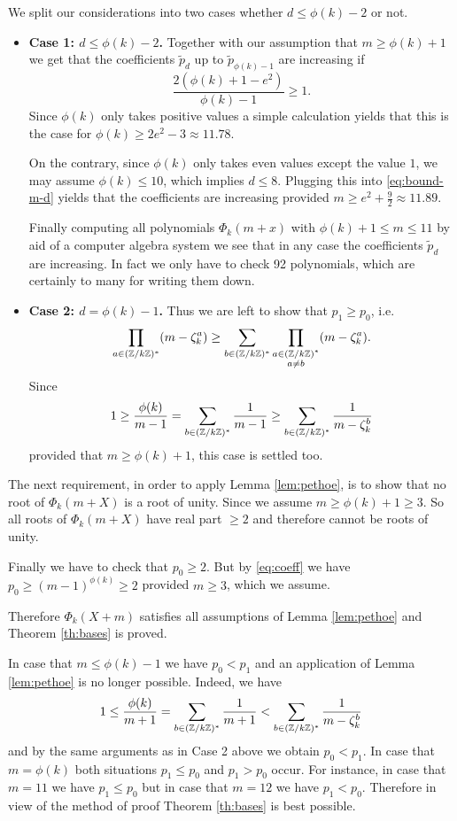 We split our considerations into two cases whether $d\leq\phi(k)-2$ or not.
\begin{itemize}
\item\textbf{Case 1: $d\leq\phi(k)-2$.} Together with our assumption
  that $m\geq\phi(k)+1$ we get that the coefficients $\tilde p_d$ up
  to $\tilde p_{\phi(k)-1}$ are increasing
  if $$\frac{2(\phi(k)+1-e^2)}{\phi(k)-1}\geq1.$$ Since $\phi(k)$ only
  takes positive values a simple calculation yields that this is the
  case for $\phi(k)\geq 2e^2-3\approx 11.78$.

  On the contrary, since $\phi(k)$ only takes even values except the
  value $1$, we may assume $\phi(k)\leq 10$, which implies
  $d\leq8$. Plugging this into \eqref{eq:bound-m-d} yields that the
  coefficients are increasing provided $m\geq e^2+\frac92\approx
  11.89$.

  Finally computing all polynomials $\Phi_k(m+x)$ with $\phi(k)+1\leq
  m\leq 11$ by aid of a computer algebra system we see that in any
  case the coefficients $\tilde p_d$ are increasing. In fact we only
  have to check 92 polynomials, which are certainly to many for
  writing them down.
\item\textbf{Case 2: $d=\phi(k)-1$.} Thus we are left to show that
  $p_1\geq p_0$, i.e.
\[\prod_{a \in ({\mathbb Z}/k{\mathbb Z})^*}(m-\zeta_k^a) \geq \sum_{b \in ({\mathbb Z}/k{\mathbb Z})^*}\prod_{\substack{a \in ({\mathbb Z}/k{\mathbb Z})^*\\ a\neq b}}(m-\zeta_k^a).\]
Since
\[1\geq \frac{\phi(k)}{m-1} = \sum_{b \in ({\mathbb Z}/k{\mathbb Z})^*}\frac{1}{m-1}\geq \sum_{b \in ({\mathbb Z}/k{\mathbb Z})^*}\frac{1}{m-\zeta_k^b} \]
provided that $m\geq\phi(k)+1$, this case is settled too.
\end{itemize}

The next requirement, in order to apply Lemma \ref{lem:pethoe}, is to
show that no root of $\Phi_k(m+X)$ is a root of unity. Since we assume
$m\geq \phi(k)+1\geq 3$. So all roots of $\Phi_k(m+X)$ have real part $\geq 2$ and therefore cannot be roots of unity.

Finally we have to check that $p_0\geq 2$. But by
\eqref{eq:coeff} we have $p_0\geq (m-1)^{\phi(k)}\geq 2$ provided $m\geq
3$, which we assume.

Therefore $\Phi_k(X+m)$ satisfies all assumptions of Lemma
\ref{lem:pethoe} and Theorem \ref{th:bases} is proved.

\begin{remark}
 In case that $m\leq \phi(k)-1$ we have $p_0<p_1$ and an application of Lemma \ref{lem:pethoe} is no longer possible.
 Indeed, we have
 \[1\leq \frac{\phi(k)}{m+1} = \sum_{b \in ({\mathbb Z}/k{\mathbb Z})^*}\frac{1}{m+1}< \sum_{b \in ({\mathbb Z}/k{\mathbb Z})^*}\frac{1}{m-\zeta_k^b} \]
 and by the same arguments as in Case 2 above we obtain $p_0<p_1$. In case that $m=\phi(k)$ both situations $p_1\leq p_0$ and $p_1>p_0$ occur. For 
instance, in case that $m=11$ we have $p_1\leq p_0$ but in case that $m=12$ we have $p_1<p_0$. Therefore in view of the method of proof Theorem \ref{th:bases} 
is best possible.
\end{remark}


